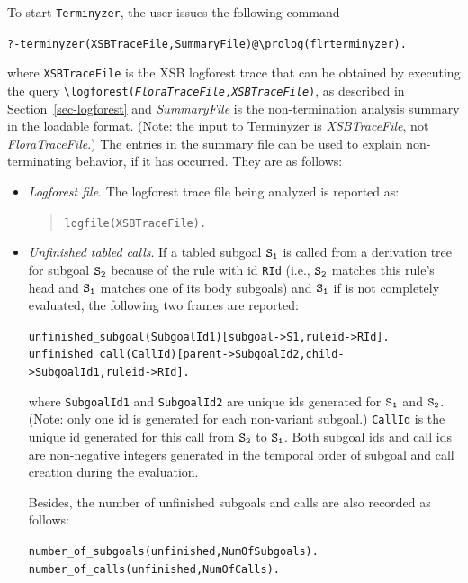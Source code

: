 \documentclass[11pt]{article}
\newcommand{\ERGO}{\mbox{\smaller{\ensuremath{\cal{E}}\smaller{{\sc{RGO}}}}}\xspace}
\newcommand{\FLSYSTEM}{\ERGO}
\newcommand{\bs}{\textbackslash}
\begin{document}
To start \texttt{Terminyzer}, the user issues the following command
\begin{alltt}
    ?- terminyzer(XSBTraceFile,SummaryFile)@\bs{}prolog(flrterminyzer).
\end{alltt}
where {\tt XSBTraceFile} is the XSB logforest trace that can be
obtained by executing the query 
{\tt \bs{}logforest(\emph{FloraTraceFile},\emph{XSBTraceFile})}, as described in
Section~\ref{sec-logforest} and \emph{SummaryFile} is the non-termination
analysis summary in the \FLSYSTEM loadable format.  (Note: the input to
Terminyzer is \emph{XSBTraceFile}, not \emph{FloraTraceFile}.)   
The entries in the summary file can be used to explain non-terminating
behavior, if it has occurred. They are as follows:
\begin{itemize}
\item \emph{Logforest file}. The logforest trace file being analyzed
  is reported as:
  \begin{quote}
    {\tt logfile(XSBTraceFile).}
  \end{quote}

\item \emph{Unfinished tabled calls}.
  If a tabled subgoal $\tt S_1$ is called from a
  derivation tree for subgoal $\tt S_2$ because of the rule with id
  {\tt RId} (i.e., $\tt S_2$ matches this rule's head and $\tt S_1$
  matches one of its body subgoals) and $\tt S_1$ if is not completely
  evaluated, the
  following two frames are reported: 
\begin{alltt}
   unfinished\_subgoal(SubgoalId1)[subgoal->S1,ruleid->RId].\\
   unfinished\_call(CallId)[parent->SubgoalId2,child->SubgoalId1,ruleid->RId].
\end{alltt}
  where {\tt SubgoalId1} and {\tt SubgoalId2} are unique ids generated
  for $\tt S_1$ and $\tt S_2$. 
  (Note: only one id is generated for each non-variant subgoal.)
  {\tt CallId} is the unique id generated for this call from $\tt S_2$
  to $\tt S_1$. 
  Both subgoal ids and call ids are non-negative integers generated in the
  temporal order of subgoal and call creation during the evaluation.

  Besides, the number of unfinished subgoals and calls are also
  recorded as follows:
\begin{alltt}
   number\_of\_subgoals(unfinished,NumOfSubgoals).\\
   number\_of\_calls(unfinished,NumOfCalls).
\end{alltt}


\end{itemize}
\end{document}
